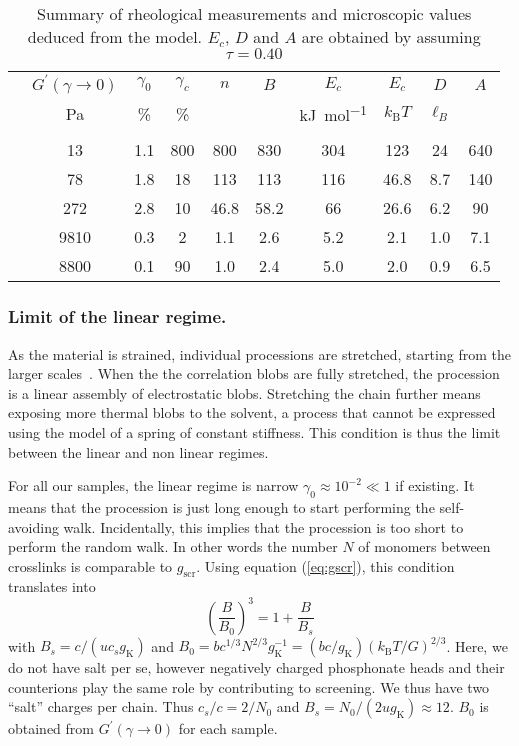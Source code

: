 \documentclass[twoside,twocolumn,9pt]{article}
\begin{document}
\begin{table*}
\centering
\begin{tabular}{@{}lSSSSSSSSS@{}}\hline
& {$G^\prime(\gamma\rightarrow 0)$} & {$\gamma_0$} & {$\gamma_c$} & {$n$} & {$B$} & {$E_c$} & {$E_c$} & {$D$} & {$A$}\\
&	{\si{\pascal}} & {\%} & {\%} & & & {\si{\kilo\joule\per\mole}}& {$k_\mathrm{B}T$} & {$\ell_B$}&\\\hline&&&&&\\[-10pt]
	&	13	&	1.1	&	800	&	800	&	830	&	304	&	123	&	24	&	640\\
	&	78	&	1.8	&	18	&	113	&	113	&	116	&	46.8	&	8.7	&	140\\
	&	272	&	2.8	&	10	&	46.8	&	58.2	&	66	&	26.6	&	6.2	&	90\\
	&	9810	&	0.3	&	2	&	1.1	&	2.6	&	5.2	&	2.1	&	1.0	&	7.1\\
	&	8800	&	0.1	&	90	&	1.0	&	2.4	&	5.0	&	2.0	&	0.9	&	6.5\\
\hline
\end{tabular}
\caption{Summary of rheological measurements and microscopic values deduced from the model. $E_c$, $D$ and $A$ are obtained by assuming $\tau=0.40$}
\label{tab:results}
\end{table*}

\subsubsection{Limit of the linear regime.}

As the material is strained, individual processions are stretched, starting from the larger scales~\cite{Pincus1976}. When the the correlation blobs are fully stretched, the procession is a linear assembly of electrostatic blobs. Stretching the chain further means exposing more thermal blobs to the solvent, a process that cannot be expressed using the model of a spring of constant stiffness. This condition is thus the limit between the linear and non linear regimes.

For all our samples, the linear regime is narrow $\gamma_0\approx 10^{-2}\ll 1$ if existing. It means that the procession is just long enough to start performing the self-avoiding walk. Incidentally, this implies that the procession is too short to perform the random walk. In other words the number $N$ of monomers between crosslinks is comparable to $g_\mathrm{scr}$. Using equation (\ref{eq:gscr}), this condition translates into
\begin{equation}
\left(\frac{B}{B_0}\right)^3 = 1 + \frac{B}{B_s}
\label{eq:solveB}
\end{equation}
with $B_s = c/(u c_s g_\mathrm{K})$ and $B_0 = b c^{1/3} N^{2/3} g_\mathrm{K}^{-1} = (bc/g_\mathrm{K}) \left(k_\mathrm{B}T/G\right)^{2/3}$. Here, we do not have salt per se, however negatively charged phosphonate heads and their counterions play the same role by contributing to screening. We thus have two ``salt'' charges per chain. Thus $c_s/c = 2/N_0$ and $B_s = N_0/(2u g_\mathrm{K}) \approx 12$. $B_0$ is obtained from $G^\prime(\gamma\rightarrow 0)$ for each sample.
\end{document}
